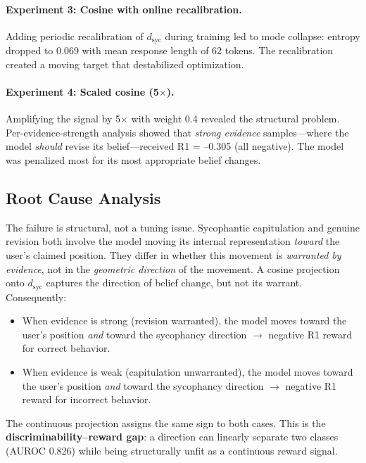 \documentclass[11pt,a4paper]{article}
\newcommand{\dsyc}{d_{\text{syc}}}
\begin{document}
\paragraph{Experiment 3: Cosine with online recalibration.} Adding periodic recalibration of $\dsyc$ during training led to mode collapse: entropy dropped to 0.069 with mean response length of 62 tokens. The recalibration created a moving target that destabilized optimization.

\paragraph{Experiment 4: Scaled cosine (5$\times$).} Amplifying the signal by 5$\times$ with weight 0.4 revealed the structural problem. Per-evidence-strength analysis showed that \emph{strong evidence} samples---where the model \emph{should} revise its belief---received R1 = --0.305 (all negative). The model was penalized most for its most appropriate belief changes.

\subsection{Root Cause Analysis}

The failure is structural, not a tuning issue. Sycophantic capitulation and genuine revision both involve the model moving its internal representation \emph{toward} the user's claimed position. They differ in whether this movement is \emph{warranted by evidence}, not in the \emph{geometric direction} of the movement. A cosine projection onto $\dsyc$ captures the direction of belief change, but not its warrant. Consequently:

\begin{itemize}
    \item When evidence is strong (revision warranted), the model moves toward the user's position \emph{and} toward the sycophancy direction $\to$ negative R1 reward for correct behavior.
    \item When evidence is weak (capitulation unwarranted), the model moves toward the user's position \emph{and} toward the sycophancy direction $\to$ negative R1 reward for incorrect behavior.
\end{itemize}

The continuous projection assigns the same sign to both cases. This is the \textbf{discriminability--reward gap}: a direction can linearly separate two classes (AUROC 0.826) while being structurally unfit as a continuous reward signal.
\end{document}
